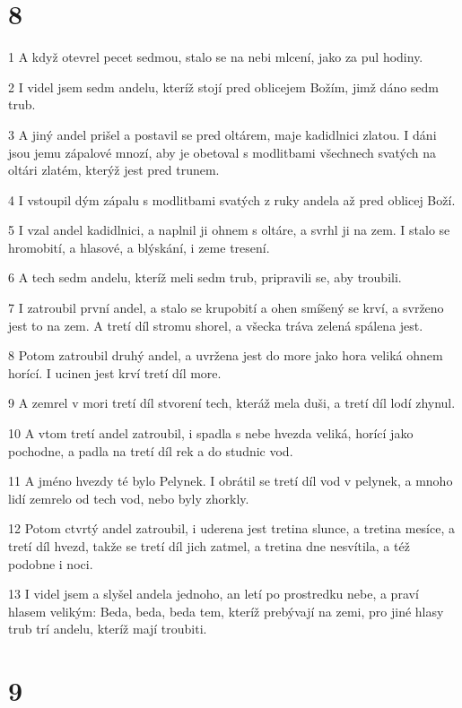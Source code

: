 \chapter{8}

\par 1 A když otevrel pecet sedmou, stalo se na nebi mlcení, jako za pul hodiny.
\par 2 I videl jsem sedm andelu, kteríž stojí pred oblicejem Božím, jimž dáno sedm trub.
\par 3 A jiný andel prišel a postavil se pred oltárem, maje kadidlnici zlatou. I dáni jsou jemu zápalové mnozí, aby je obetoval s modlitbami všechnech svatých na oltári zlatém, kterýž jest pred trunem.
\par 4 I vstoupil dým zápalu s modlitbami svatých z ruky andela až pred oblicej Boží.
\par 5 I vzal andel kadidlnici, a naplnil ji ohnem s oltáre, a svrhl ji na zem. I stalo se hromobití, a hlasové, a blýskání, i zeme tresení.
\par 6 A tech sedm andelu, kteríž meli sedm trub, pripravili se, aby troubili.
\par 7 I zatroubil první andel, a stalo se krupobití a ohen smíšený se krví, a svrženo jest to na zem. A tretí díl stromu shorel, a všecka tráva zelená spálena jest.
\par 8 Potom zatroubil druhý andel, a uvržena jest do more jako hora veliká ohnem horící. I ucinen jest krví tretí díl more.
\par 9 A zemrel v mori tretí díl stvorení tech, kteráž mela duši, a tretí díl lodí zhynul.
\par 10 A vtom tretí andel zatroubil, i spadla s nebe hvezda veliká, horící jako pochodne, a padla na tretí díl rek a do studnic vod.
\par 11 A jméno hvezdy té bylo Pelynek. I obrátil se tretí díl vod v pelynek, a mnoho lidí zemrelo od tech vod, nebo byly zhorkly.
\par 12 Potom ctvrtý andel zatroubil, i uderena jest tretina slunce, a tretina mesíce, a tretí díl hvezd, takže se tretí díl jich zatmel, a tretina dne nesvítila, a též podobne i noci.
\par 13 I videl jsem a slyšel andela jednoho, an letí po prostredku nebe, a praví hlasem velikým: Beda, beda, beda tem, kteríž prebývají na zemi, pro jiné hlasy trub trí andelu, kteríž mají troubiti.

\chapter{9}

